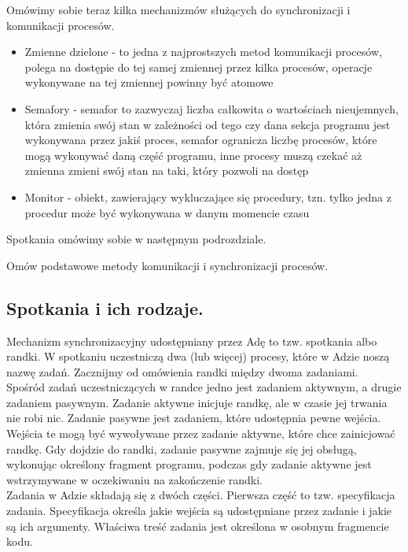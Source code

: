 \documentclass[a4paper,15pt]{article}
\newcommand{\ask}[2]{
    \begin{tcolorbox}[colback=black!5!white,colframe=gray,title={Pytanie #1}]
        #2
    \end{tcolorbox}
}
\begin{document}
Omówimy sobie teraz kilka mechanizmów służących do synchronizacji i komunikacji procesów.

\begin{itemize}
\item Zmienne dzielone - to jedna z najprostszych metod komunikacji procesów, polega na dostępie do tej samej zmiennej przez kilka procesów, operacje wykonywane na tej zmiennej powinny być atomowe
\item Semafory - semafor to zazwyczaj liczba całkowita o wartościach nieujemnych, która zmienia swój stan w zależności od tego czy dana sekcja programu jest wykonywana przez jakiś proces, semafor ogranicza liczbę procesów, które mogą wykonywać daną część programu, inne procesy muszą czekać aż zmienna zmieni swój stan na taki, który pozwoli na dostęp 
\item Monitor - obiekt, zawierający wykluczające się procedury, tzn. tylko jedna z procedur może być wykonywana w danym momencie czasu 
\end{itemize}

Spotkania omówimy sobie w następnym podrozdziale.

\ask{}{
Omów podstawowe metody komunikacji i synchronizacji procesów.
}

\subsection{Spotkania i ich rodzaje.}
Mechanizm synchronizacyjny udostępniany przez Adę to tzw. spotkania albo randki. W spotkaniu uczestniczą dwa (lub więcej) procesy, które w Adzie noszą nazwę zadań. Zacznijmy od omówienia randki między dwoma zadaniami. \\

Spośród zadań uczestniczących w randce jedno jest zadaniem aktywnym, a drugie zadaniem pasywnym. Zadanie aktywne inicjuje randkę, ale w czasie jej trwania nie robi nic. Zadanie pasywne jest zadaniem, które udostępnia pewne wejścia. Wejścia te mogą być wywoływane przez zadanie aktywne, które chce zainicjować randkę. Gdy dojdzie do randki, zadanie pasywne zajmuje się jej obsługą, wykonując określony fragment programu, podczas gdy zadanie aktywne jest wstrzymywane w oczekiwaniu na zakończenie randki. \\

Zadania w Adzie składają się z dwóch części. Pierwsza część to tzw. specyfikacja zadania. Specyfikacja określa jakie wejścia są udostępniane przez zadanie i jakie są ich argumenty. Właściwa treść zadania jest określona w osobnym fragmencie kodu. \\
\end{document}
